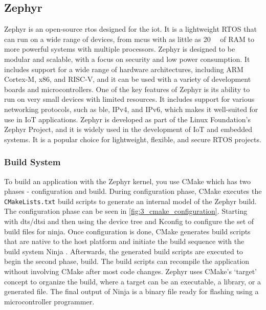 \subsection{Zephyr}
Zephyr is an \gls{open-source} \gls{rtos} designed for the \gls{iot}. It is a lightweight RTOS that can run on a wide range of devices, from \gls{mcu}s with as little as \qty{20}{\kilo\byte} of RAM to more powerful systems with multiple processors. Zephyr is designed to be modular and scalable, with a focus on security and low power consumption. It includes support for a wide range of hardware architectures, including ARM Cortex-M, x86, and RISC-V, and it can be used with a variety of development boards and microcontrollers. One of the key features of Zephyr is its ability to run on very small devices with limited resources. It includes support for various networking protocols, such as \gls{ble}, IPv4, and IPv6, which makes it well-suited for use in IoT applications. Zephyr is developed as part of the Linux Foundation's Zephyr Project, and it is widely used in the development of IoT and embedded systems. It is a popular choice for lightweight, flexible, and secure RTOS projects.

\subsubsection{Build System}
To build an application with the Zephyr kernel, you use CMake which has two phases - configuration and build. During configuration phase, CMake executes the \texttt{CMakeLists.txt} build scripts to generate an internal model of the Zephyr build. The configuration phase can be seen in \cref{fig:3_cmake_configuration}. Starting with \gls{dts}/\gls{dtsi} and then using the device tree and Kconfig to configure the set of build files for ninja. Once configuration is done, CMake generates build scripts that are native to the host platform and initiate the build sequence with the build system Ninja \cite{ninja}. Afterwards, the generated build scripts are executed to begin the second phase, build. The build scripts can recompile the application without involving CMake after most code changes. Zephyr uses CMake's ‘target’ concept to organize the build, where a target can be an executable, a library, or a generated file. The final output of Ninja is a binary file ready for \gls{flashing} using a microcontroller programmer.

